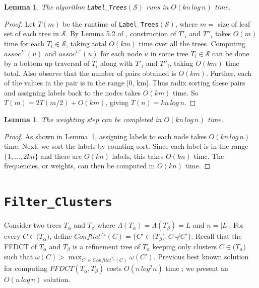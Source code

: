 \documentclass[final,1p,times]{elsarticle}
\newcommand{\compatible}{\smile}
\newcommand{\leafset}{\Lambda}
\newcommand{\weight}{\omega}
\newcommand{\TA}{T_\alpha}
\newcommand{\TB}{T_\beta}
\newtheorem{lemma}[theorem]{Lemma}
\begin{document}
    \medskip
    \begin{lemma}
        \label{lem:labelclustersruntime}
        The algorithm \texttt{Label\_Trees}$(\mathcal{S})$ runs in $O(kn\,log\,n)$ time.
    \end{lemma}
        \begin{proof}
            Let $T(m)$ be the runtime of \texttt{Label\_Trees}$(\mathcal{S})$, where $m =$ size of leaf set of each tree in $\mathcal{S}$. By Lemma 5.2 of \cite{farach1995fast}, construction of $T'_i$ and $T''_i$ takes $O(m)$ time for each $T_i \in \mathcal{S}$, taking total $O(km)$ time over all the trees. Computing $assoc^{L'}(u)$ and $assoc^{L''}(u)$ for each node $u$ in some tree $T_i \in \mathcal{S}$ can be done by a bottom up traversal of $T_i$ along with $T'_i$ and $T''_i$, taking $O(km)$ time total. Also observe that the number of pairs obtained is $O(km)$. Further, each of the values in the pair is in the range [0, km]. Thus radix sorting these pairs and assigning labels back to the nodes takes $O(km)$ time. So $T(m) = 2T(m/2) + O(km)$, giving $T(n) = kn\,log\,n$.
        \end{proof}

    \medskip
    \begin{lemma}
        \label{lem:weightingruntime}
        The weighting step can be completed in $O(kn\,log\,n)$ time.
    \end{lemma}
        \begin{proof}
		As shown in Lemma~\ref{lem:labelclustersruntime}, assigning labels to each node takes $O(kn\,log\,n)$ time. Next, we sort the labels by counting sort. Since each label is in the range $\{1, \ldots, 2kn\}$ and there are $O(kn)$ labels, this takes $O(kn)$ time. The frequencies, or weights, can then be computed in $O(kn)$ time.
        \end{proof}

    \section{\texttt{Filter\_Clusters}}
    \label{sec:filterclusters}

    Consider two trees $\TA$ and $\TB$ where $\leafset(\TA) = \leafset(\TB) = L$ and $n = |L|$.
    For every $C \in \mathcal(\TA)$, define $Conflict^{\TB}(C) =  \{C' \in \mathcal(\TB) : C \not\compatible C' \}$.
    Recall that the FFDCT of $\TA$ and $\TB$ is a refinement tree of $\TA$ keeping only clusters $C \in \mathcal(\TA)$ such that $\weight(C) > \max_{C' \in Conflict^{\TB}(C)} \weight(C')$.
    Previous best known solution for computing $FFDCT(\TA, \TB)$ costs $O(n\,log^2 n)$ time \cite{jansson2018algorithms}; we present an $O(n\,log\,n)$ solution.
\end{document}
